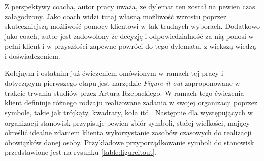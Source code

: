 Z perspektywy coacha, autor pracy uważa, ze dylemat ten został na pewien czas załagodzony. Jako coach widzi tutaj własną możliwość wzrostu poprzez
skuteczniejszą możliwość pomocy klientowi w tak trudnych wyborach. Dodatkowo jako coach, autor jest zadowolony że decyzję i odpowiedzialność za nią
ponosi w pełni klient i w przyszłości zapewne powróci do tego dylematu, z większą wiedzą i doświadczeniem.

Kolejnym i ostatnim już ćwiczeniem omówionym w ramach tej pracy i dotyczącym pierwszego etapu jest narzędzie \emph{Figure it out} zaproponowane
w trakcie trwania studiów przez Artura Rzepackiego. W ramach tego ćwiczenia klient definiuje różnego rodzaju realizowane zadania w swojej
organizacji poprzez symbole, takie jak trójkąty, kwadraty, koła itd.. Następnie dla występujących w organizacji stanowisk przypisuje pewien
zbiór symboli, stałej wielkości, mający określić idealne zdaniem klienta wykorzystanie zasobów czasowych do realizacji obowiązków danej osoby.
Przykładowe przyporządkowanie symboli do stanowisk przedstawione jest na rysunku \ref{table:figureitout}.

